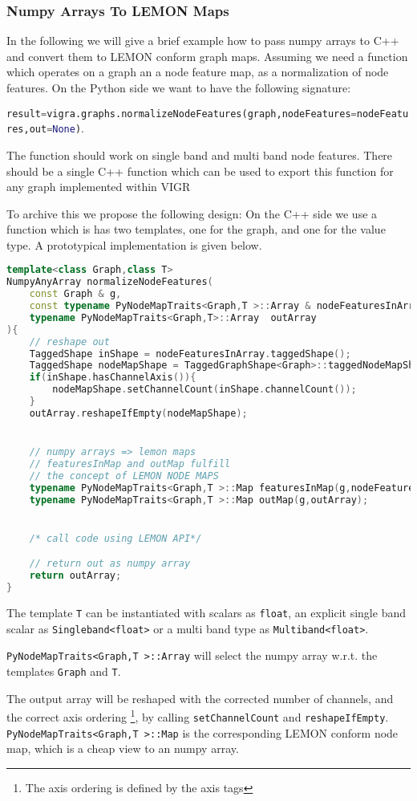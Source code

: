 \subsubsection{Numpy Arrays To LEMON Maps}


In the following we will give a brief example how to pass numpy arrays to C++
and convert them to LEMON conform graph maps.
Assuming we need a function which operates on a graph an a node feature map,
as a normalization of node features.
On the Python side we want to have the following signature:

\lstinline[language=Python]{result=vigra.graphs.normalizeNodeFeatures(graph,nodeFeatures=nodeFeatures,out=None)}.

The function should work on single band and multi band node features.
There should be a single C++ function which can be used to export
this function for any graph implemented within VIGR


\begin{minipage}{\textwidth}

To archive this we propose the following design:
On the C++ side we use a function  which
is has two templates, one for the graph, and one for the value type.
A prototypical implementation is given below.

\begin{lstlisting}[language=c++]
template<class Graph,class T>
NumpyAnyArray normalizeNodeFeatures(
    const Graph & g,
    const typename PyNodeMapTraits<Graph,T >::Array & nodeFeaturesInArray,
    typename PyNodeMapTraits<Graph,T>::Array  outArray 
){
    // reshape out 
    TaggedShape inShape = nodeFeaturesInArray.taggedShape();
    TaggedShape nodeMapShape = TaggedGraphShape<Graph>::taggedNodeMapShape(graph);
    if(inShape.hasChannelAxis()){
        nodeMapShape.setChannelCount(inShape.channelCount());
    }
    outArray.reshapeIfEmpty(nodeMapShape);


    // numpy arrays => lemon maps 
    // featuresInMap and outMap fulfill
    // the concept of LEMON NODE MAPS
    typename PyNodeMapTraits<Graph,T >::Map featuresInMap(g,nodeFeaturesInArray);
    typename PyNodeMapTraits<Graph,T >::Map outMap(g,outArray);


    /* call code using LEMON API*/

    // return out as numpy array
    return outArray;
}
\end{lstlisting}

The template \lstinline{T} can be instantiated with scalars as \lstinline{float}, an explicit single band scalar as \lstinline{Singleband<float>}
or a multi band type as \lstinline{Multiband<float>}.

\lstinline{PyNodeMapTraits<Graph,T >::Array} will select the numpy array w.r.t.
the templates \lstinline{Graph} and \lstinline{T}.

The output array will be reshaped with the corrected number of channels,
and the correct axis ordering \footnote{The axis ordering is defined by the axis tags}, by calling \lstinline{setChannelCount}
and \lstinline{reshapeIfEmpty}.
\lstinline{PyNodeMapTraits<Graph,T >::Map} is the corresponding LEMON conform  node map,
which is a cheap view to an numpy array. 
\end{minipage}


